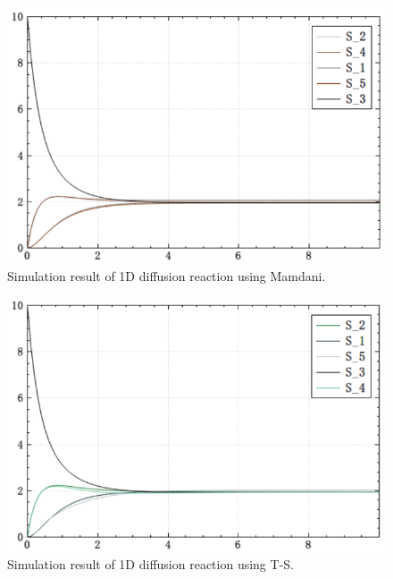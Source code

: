\documentclass[journal,a4paper,onecolumn]{article}
\begin{document}
\begin{figure}[!hbt]
	\begin{center}
		\includegraphics[width=\columnwidth]{fig22}
		\caption{Simulation result of 1D diffusion reaction using Mamdani.}
		\label{fig:Simulation result of 1D diffusion reaction using Mamdani.}
	\end{center}
\end{figure}

\begin{figure}[!hbt]
	\begin{center}
		\includegraphics[width=\columnwidth]{fig23}
		\caption{Simulation result of 1D diffusion reaction using T-S.}
		\label{fig:Simulation result of 1D diffusion reaction using T-S.}
	\end{center}
\end{figure}
\end{document}
